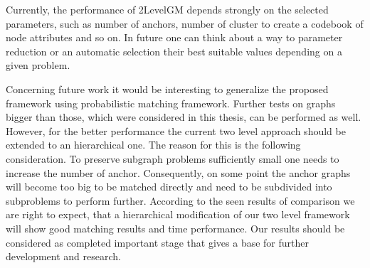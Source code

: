 Currently, the performance of 2LevelGM depends strongly on the selected parameters, such as number of anchors, number of cluster to create a codebook of node attributes and so on. In future one can think about a way to parameter reduction or an automatic selection their best suitable values depending on a given problem. %

Concerning future work it would be interesting to generalize the proposed framework using probabilistic matching framework. Further tests on graphs bigger than those, which were considered in this thesis, can be performed as well. However, for the better performance the current two level approach should be extended to an hierarchical one. The reason for this is the following consideration. To preserve subgraph problems sufficiently small one needs to increase the number of anchor. Consequently, on some point the anchor graphs will become too big to be matched directly and need to be subdivided into subproblems to perform further. According to the seen results of comparison we are right to expect, that a hierarchical modification of our two level framework will show good matching results and time performance. 
Our results should be considered as completed important stage that gives a base for further development and research.

 
